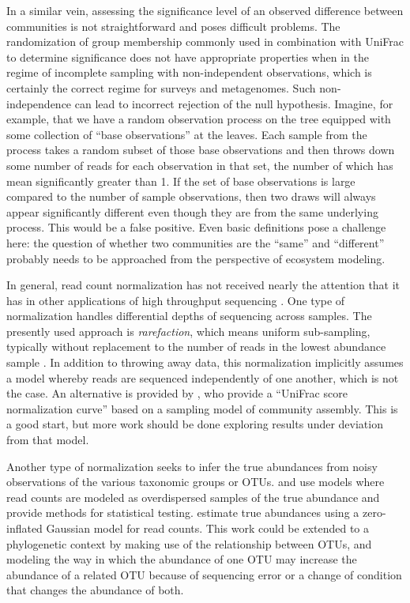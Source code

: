 \documentclass{amsart}
\begin{document}
In a similar vein, assessing the significance level of an observed difference between communities is not straightforward and poses difficult problems.
The randomization of group membership commonly used in combination with UniFrac to determine significance does not have appropriate properties when in the regime of incomplete sampling with non-independent observations, which is certainly the correct regime for surveys and metagenomes.
Such non-independence can lead to incorrect rejection of the null hypothesis.
Imagine, for example, that we have a random observation process on the tree equipped with some collection of ``base observations'' at the leaves.
Each sample from the process takes a random subset of those base observations and then throws down some number of reads for each observation in that set, the number of which has mean significantly greater than 1.
If the set of base observations is large compared to the number of sample observations, then two draws will always appear significantly different even though they are from the same underlying process.
This would be a false positive.
Even basic definitions pose a challenge here: the question of whether two communities are the ``same'' and ``different'' probably needs to be approached from the perspective of ecosystem modeling.

In general, read count normalization has not received nearly the attention that it has in other applications of high throughput sequencing \citep[such as RNA-Seq, e.g.][]{anders2010differential,robinson2010edger}.
One type of normalization handles differential depths of sequencing across samples.
The presently used approach is \textit{rarefaction}, which means uniform sub-sampling, typically without replacement to the number of reads in the lowest abundance sample \citep{caporaso2010qiime,schloss2009introducing}.
In addition to throwing away data, this normalization implicitly assumes a model whereby reads are sequenced independently of one another, which is not the case.
An alternative is provided by \citet{o2012phylogenetic}, who provide a ``UniFrac score normalization curve'' based on a sampling model of community assembly.
This is a good start, but more work should be done exploring results under deviation from that model.

Another type of normalization seeks to infer the true abundances from noisy observations of the various taxonomic groups or OTUs.
\citet{holmes2012dirichlet} and \citet{la2012hypothesis} use models where read counts are modeled as overdispersed samples of the true abundance and provide methods for statistical testing.
\citet{paulson2013differential} estimate true abundances using a zero-inflated Gaussian model for read counts.
This work could be extended to a phylogenetic context by making use of the relationship between OTUs, and modeling the way in which the abundance of one OTU may increase the abundance of a related OTU because of sequencing error or a change of condition that changes the abundance of both.
\end{document}
